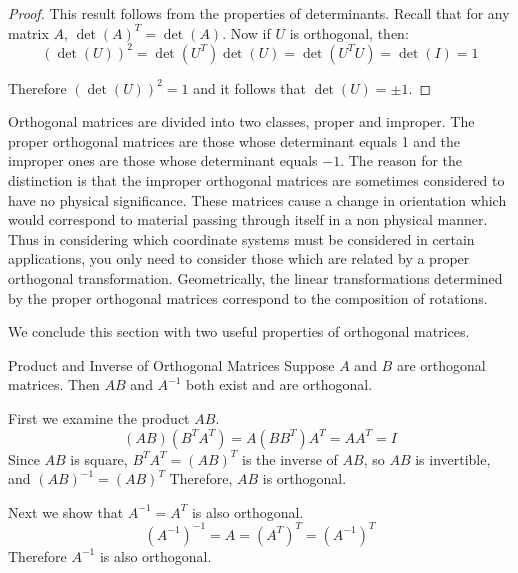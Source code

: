 \begin{proof}
This result follows from the properties of determinants. Recall that
for any matrix $A$, $\det(A)^T = \det(A)$. Now if $U$ is orthogonal, then:
\begin{equation*}
(\det \left( U\right)) ^{2}=\det \left( U^{T}\right) \det \left( U\right)
=\det \left( U^{T}U\right) =\det \left( I\right) =1
\end{equation*}

Therefore $(\det (U))^2 = 1$ and it follows that $\det \left( U\right) = \pm 1$. 
\end{proof}

Orthogonal matrices are divided into two classes, proper and improper.
The proper orthogonal matrices are those whose determinant equals 1
and the improper ones are those whose determinant equals $-1$. The
reason for the distinction is that the improper orthogonal matrices
are sometimes considered to have no physical significance. These
matrices cause a change in orientation which would correspond to
material passing through itself in a non physical manner. Thus in
considering which coordinate systems must be considered in certain
applications, you only need to consider those which are related by a
proper orthogonal transformation. Geometrically, the linear
transformations determined by the proper orthogonal matrices
correspond to the composition of rotations.

We conclude this section with two useful properties of orthogonal matrices. 

\begin{example}{Product and Inverse of Orthogonal Matrices}\label{exa:productinverseorthogonal}
Suppose $A$ and $B$ are orthogonal matrices. Then $AB$ and $A^{-1}$ both exist and are orthogonal.
\end{example}

\begin{solution}
First we examine the product $AB$. 
\[ (AB)(B^TA^T)=A(BB^T)A^T =AA^T=I \]
Since $AB$ is square, $B^TA^T=(AB)^T$ is the inverse of
$AB$, so $AB$ is invertible, and $(AB)^{-1}=(AB)^T$
Therefore, $AB$ is orthogonal.

Next we show that $A^{-1}=A^T$ is also orthogonal. 
\[ (A^{-1})^{-1} = A = (A^T)^{T}
=(A^{-1})^{T} \]
Therefore $A^{-1}$ is also orthogonal.
\end{solution}